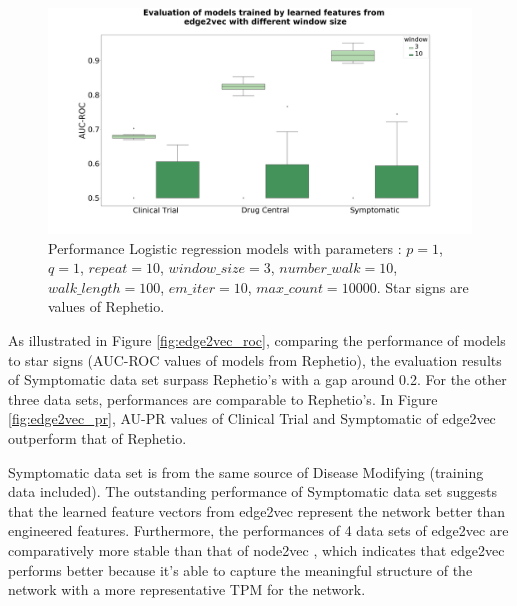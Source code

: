 \begin{figure}[!h]
    \centering
    \includegraphics[scale=0.2]
    {figures/edge2vec_ws.png}
    \captionsetup{justification=centering}
    \caption[Evaluation of different window\_size in edge2vec]{\label{fig:edge2vec_ws}Performance Logistic regression models with parameters : $p = 1$, $q = 1$, $repeat = 10$, $window\_size = 3$, $number\_walk = 10$, $walk\_length =  100$, $em\_iter = 10$, $max\_count = 10000$. Star signs are values of Rephetio.
}
\end{figure}

As illustrated in Figure \ref{fig:edge2vec_roc}, comparing the performance of models to star signs (\ac{AUC-ROC} values of models from Rephetio), the evaluation results of Symptomatic data set surpass Rephetio's with a gap around 0.2. For the other three data sets, performances are comparable to Rephetio's. In Figure \ref{fig:edge2vec_pr}, \ac{AU-PR} values of Clinical Trial and Symptomatic of edge2vec outperform that of Rephetio. 

Symptomatic data set is from the same source of Disease Modifying (training data included). The outstanding performance of Symptomatic data set suggests that the learned feature vectors from edge2vec represent the network better than engineered features. Furthermore, the performances of 4 data sets of edge2vec are comparatively more stable than that of node2vec , which indicates that edge2vec performs better because it's able to capture the meaningful structure of the network with a more representative TPM for the network.

